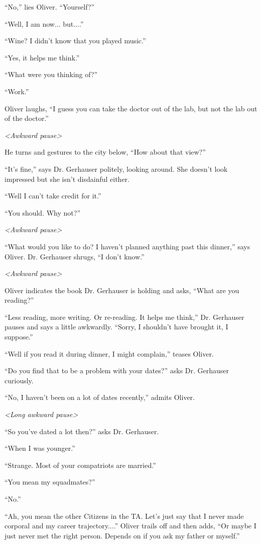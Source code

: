 ``No,'' lies Oliver.  ``Yourself?''

``Well, I am now... but....''

``Wine?  I didn't know that you played music.''

``Yes, it helps me think.''

``What were you thinking of?''

``Work.''

Oliver laughs, ``I guess you can take the doctor out of the lab, but not the lab out of the doctor.''

\textit{\textless Awkward pause\textgreater }

He turns and gestures to the city below, ``How about that view?''

``It's fine,'' says Dr. Gerhauser politely, looking around.  She doesn't look impressed but she isn't disdainful either.

``Well I can't take credit for it.''

``You should.  Why not?''

\textit{\textless Awkward pause\textgreater }

``What would you like to do?  I haven't planned anything past this dinner,'' says Oliver.  Dr. Gerhauser shrugs, ``I don't know.''

\textit{\textless Awkward pause\textgreater }

Oliver indicates the book Dr. Gerhauser is holding and asks, ``What are you reading?''

``Less reading, more writing.  Or re-reading.  It helps me think,'' Dr. Gerhauser pauses and says a little awkwardly.  ``Sorry, I shouldn't have brought it, I suppose.''

``Well if you read it during dinner, I might complain,'' teases Oliver.

``Do you find that to be a problem with your dates?'' asks Dr. Gerhauser curiously.

``No, I haven't been on a lot of dates recently,'' admits Oliver.

\textit{\textless Long awkward pause\textgreater }

``So you've dated a lot then?'' asks Dr. Gerhauser.

``When I was younger.''

``Strange.  Most of your compatriots are married.''

``You mean my squadmates?''

``No.''

``Ah, you mean the other Citizens in the TA.  Let's just say that I never made corporal and my career trajectory....'' Oliver trails off and then adds, ``Or maybe I just never met the right person.  Depends on if you ask my father or myself.''


